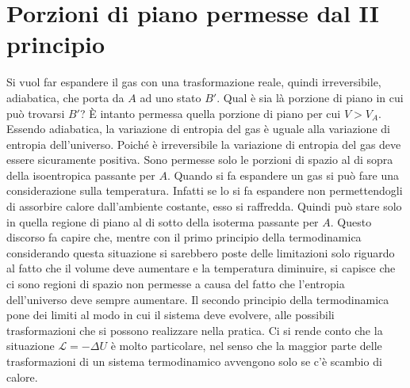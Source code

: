 \documentclass[10pt,a4paper]{book}
\begin{document}
\section{Porzioni di piano permesse dal II principio}

Si vuol far espandere il gas con una trasformazione reale, quindi irreversibile, adiabatica, che porta da $A$ ad uno stato $B'$. Qual è sia là porzione di piano in cui può trovarsi $B'$?
È intanto permessa quella porzione di piano per cui $V>V_A$. Essendo adiabatica, la variazione di entropia del gas è uguale alla variazione di entropia dell'universo. Poiché è irreversibile la variazione di entropia del gas deve essere sicuramente positiva. Sono permesse solo le porzioni di spazio al di sopra della isoentropica passante per $A$.
Quando si fa espandere un gas si può fare una considerazione sulla temperatura. Infatti se lo si fa espandere non permettendogli di assorbire calore dall'ambiente costante, esso si raffredda. Quindi può stare solo in quella regione di piano al di sotto della isoterma passante per $A$.
Questo discorso fa capire che, mentre con il primo principio della termodinamica considerando questa situazione si sarebbero poste delle limitazioni solo riguardo al fatto che il volume deve aumentare e la temperatura diminuire, si capisce che ci sono regioni di spazio non permesse a causa del fatto che l'entropia dell'universo deve sempre aumentare. Il secondo principio della termodinamica pone dei limiti al modo in cui il sistema deve evolvere, alle possibili trasformazioni che si possono realizzare nella pratica. Ci si rende conto che la situazione $\mathcal{L} = -\Delta U$ è molto particolare, nel senso che la maggior parte delle trasformazioni di un sistema termodinamico avvengono solo se c'è scambio di calore.
\end{document}
